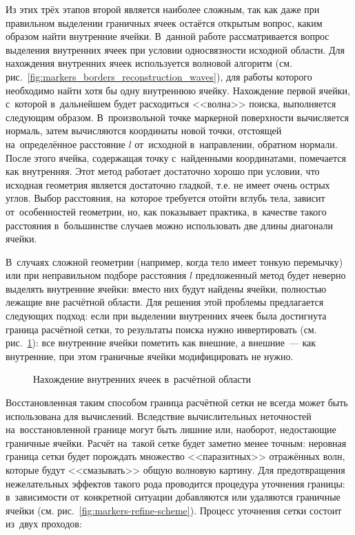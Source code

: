 \documentclass[thesis.tex]{subfiles}
\begin{document}
    Из этих трёх этапов второй является наиболее сложным, так как даже при правильном выделении граничных ячеек остаётся
    открытым вопрос, каким образом найти внутренние ячейки. В~данной работе рассматривается вопрос выделения внутренних
    ячеек при условии односвязности исходной области. Для нахождения внутренних ячеек используется волновой алгоритм
    (см. рис.~\ref{fig:markers_borders_reconstruction_waves}), для работы которого необходимо найти хотя бы одну
    внутреннюю ячейку. Нахождение первой ячейки, с~которой в~дальнейшем будет расходиться <<волна>> поиска, выполняется
    следующим образом. В~произвольной точке маркерной поверхности вычисляется нормаль, затем вычисляются координаты
    новой точки, отстоящей на~определённое расстояние $l$ от~исходной в~направлении, обратном нормали. После этого
    ячейка, содержащая точку с~найденными координатами, помечается как внутренняя. Этот метод работает достаточно хорошо
    при условии, что исходная геометрия является достаточно гладкой, т.е. не имеет очень острых углов. Выбор расстояния,
    на~которое требуется отойти вглубь тела, зависит от~особенностей геометрии, но, как показывает практика, в~качестве
    такого расстояния в~большинстве случаев можно использовать две длины диагонали ячейки.

    В~случаях сложной геометрии (например, когда тело имеет тонкую перемычку) или при неправильном подборе расстояния $l$
    предложенный метод будет неверно выделять внутренние ячейки: вместо них будут найдены ячейки, полностью лежащие вне
    расчётной области. Для решения этой проблемы предлагается следующих подход: если при выделении внутренних ячеек была
    достигнута граница расчётной сетки, то результаты поиска нужно инвертировать (см. рис.~\ref{fig:markers_border_inverse}):
    все внутренние ячейки пометить как внешние, а внешние~--- как внутренние, при этом граничные ячейки модифицировать
    не нужно.

    \begin{figure}[ht!]
        \centering
            {}
            {}
        \caption{Нахождение внутренних ячеек в~расчётной области}
        \label{fig:markers_border_inverse}
    \end{figure}

    Восстановленная таким способом граница расчётной сетки не всегда может быть использована для вычислений. Вследствие
    вычислительных неточностей на~восстановленной границе могут быть лишние или, наоборот, недостающие граничные ячейки.
    Расчёт на~такой сетке будет заметно менее точным: неровная граница сетки будет порождать множество <<паразитных>>
    отражённых волн, которые будут <<смазывать>> общую волновую картину. Для предотвращения нежелательных эффектов
    такого рода проводится процедура уточнения границы: в~зависимости от~конкретной ситуации добавляются или
    удаляются граничные ячейки (см. рис.~\ref{fig:markers-refine-scheme}). Процесс уточнения сетки состоит из~двух
    проходов:
\end{document}
